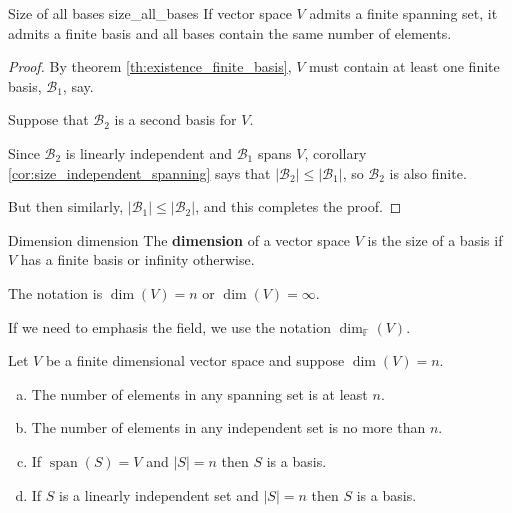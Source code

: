 \begin{theorem}{Size of all bases \cite{math2601_notes}}{size_all_bases}
If vector space $V$ admits a finite spanning set, it admits a finite basis and all bases contain the same number of elements.

\begin{proof}
By theorem \ref{th:existence_finite_basis}, $V$ must contain at least one finite basis, $\mathcal{B}_1$, say.

Suppose that $\mathcal{B}_2$ is a second basis for $V$.

Since $\mathcal{B}_2$ is linearly independent and $\mathcal{B}_1$ spans $V$, corollary \ref{cor:size_independent_spanning} says that $\lvert \mathcal{B}_2 \rvert \leq \lvert \mathcal{B}_1 \rvert$, so $\mathcal{B}_2$ is also finite.

But then similarly, $\lvert \mathcal{B}_1 \rvert \leq \lvert \mathcal{B}_2 \rvert$, and this completes the proof.
\end{proof}
\end{theorem}

\begin{definition}{Dimension \cite{math2601_notes}}{dimension}
The \textbf{dimension} of a vector space $V$ is the size of a basis if $V$ has a finite basis or infinity otherwise.

The notation is $\dim (V) = n$ or $\dim(V) = \infty$.

If we need to emphasis the field, we use the notation $\dim_\mathbb{F}(V)$.
\end{definition}

\begin{lemma}{\cite{math2601_notes}}{}
Let $V$ be a finite dimensional vector space and suppose $\dim (V) = n$.
\begin{enumerate}[a)]
	\item The number of elements in any spanning set is at least $n$.
	\item The number of elements in any independent set is no more than $n$.
	\item If $\operatorname{span} (S) = V$ and $\lvert S \rvert = n$ then $S$ is a basis.
	\item If $S$ is a linearly independent set and $\lvert S \rvert = n$ then $S$ is a basis.
\end{enumerate}
\end{lemma}

